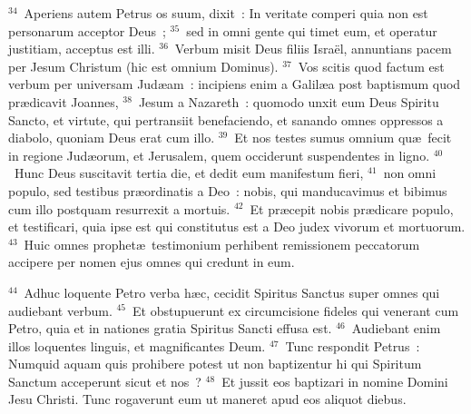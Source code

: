 ${}^{34}$~Aperiens autem Petrus os suum, dixit~: In veritate comperi quia non est personarum acceptor Deus~;
${}^{35}$~sed in omni gente qui timet eum, et operatur justitiam, acceptus est illi.
${}^{36}$~Verbum misit Deus filiis Isra\"el, annuntians pacem per Jesum Christum (hic est omnium Dominus).
${}^{37}$~Vos scitis quod factum est verbum per universam Jud\ae am~: incipiens enim a Galil\ae a post baptismum quod pr\ae dicavit Joannes,
${}^{38}$~Jesum a Nazareth~: quomodo unxit eum Deus Spiritu Sancto, et virtute, qui pertransiit benefaciendo, et sanando omnes oppressos a diabolo, quoniam Deus erat cum illo.
${}^{39}$~Et nos testes sumus omnium qu\ae\ fecit in regione Jud\ae orum, et Jerusalem, quem occiderunt suspendentes in ligno.
${}^{40}$~Hunc Deus suscitavit tertia die, et dedit eum manifestum fieri,
${}^{41}$~non omni populo, sed testibus pr\ae ordinatis a Deo~: nobis, qui manducavimus et bibimus cum illo postquam resurrexit a mortuis.
${}^{42}$~Et pr\ae cepit nobis pr\ae dicare populo, et testificari, quia ipse est qui constitutus est a Deo judex vivorum et mortuorum.
${}^{43}$~Huic omnes prophet\ae\ testimonium perhibent remissionem peccatorum accipere per nomen ejus omnes qui credunt in eum.


${}^{44}$~Adhuc loquente Petro verba h\ae c, cecidit Spiritus Sanctus super omnes qui audiebant verbum.
${}^{45}$~Et obstupuerunt ex circumcisione fideles qui venerant cum Petro, quia et in nationes gratia Spiritus Sancti effusa est.
${}^{46}$~Audiebant enim illos loquentes linguis, et magnificantes Deum.
${}^{47}$~Tunc respondit Petrus~: Numquid aquam quis prohibere potest ut non baptizentur hi qui Spiritum Sanctum acceperunt sicut et nos~?
${}^{48}$~Et jussit eos baptizari in nomine Domini Jesu Christi. Tunc rogaverunt eum ut maneret apud eos aliquot diebus.

